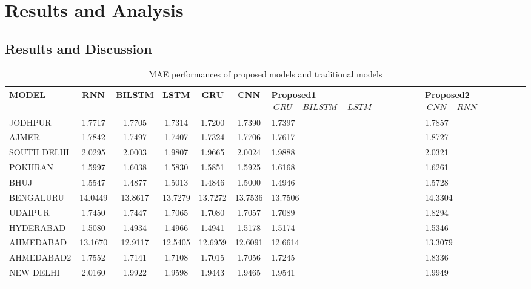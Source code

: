 
\chapter{Results and Analysis} %

\label{c5} %

\section{Results and Discussion}


\begin{table*}[!ht]
  \centering
  \setlength{\tabcolsep}{3pt}
  {\renewcommand{\arraystretch}{1}%
  \caption{MAE performances of proposed models  and traditional models}
  \begin{tabular}{|l|c|c|c|c|c|p{}|p{}|}
  \hline
  \textbf{MODEL} & \textbf{RNN} & \textbf{BILSTM} & \textbf{LSTM} & \textbf{GRU} & \textbf{CNN} &\textbf{Proposed1 \(\ GRU-BILSTM-LSTM \)\ } & \textbf{Proposed2 \(\ CNN-RNN\)\ } \\ \hline
  JODHPUR & 1.7717 & 1.7705 & 1.7314 & 1.7200 & 1.7390 & 1.7397 & 1.7857 \\ \hline
  AJMER & 1.7842 & 1.7497 & 1.7407 & 1.7324 & 1.7706 & 1.7617 & 1.8727 \\ \hline
  SOUTH DELHI & 2.0295 & 2.0003 & 1.9807 & 1.9665 & 2.0024 & 1.9888 & 2.0321 \\ \hline
  POKHRAN & 1.5997 & 1.6038 & 1.5830 & 1.5851 & 1.5925 & 1.6168 & 1.6261 \\ \hline
  BHUJ & 1.5547 & 1.4877 & 1.5013 & 1.4846 & 1.5000 & 1.4946 & 1.5728 \\ \hline
  BENGALURU & 14.0449 & 13.8617 & 13.7279 & 13.7272 & 13.7536 & 13.7506 & 14.3304 \\ \hline
  UDAIPUR & 1.7450 & 1.7447 & 1.7065 & 1.7080 & 1.7057 & 1.7089 & 1.8294 \\ \hline
  HYDERABAD & 1.5080 & 1.4934 & 1.4966 & 1.4941 & 1.5178 & 1.5174 & 1.5346 \\ \hline
  AHMEDABAD & 13.1670 & 12.9117 & 12.5405 & 12.6959 & 12.6091 & 12.6614 & 13.3079 \\ \hline
  AHMEDABAD2 & 1.7552 & 1.7141 & 1.7108 & 1.7015 & 1.7056 & 1.7245 & 1.8336 \\ \hline
  NEW DELHI & 2.0160 & 1.9922 & 1.9598 & 1.9443 & 1.9465 & 1.9541 & 1.9949 \\ \hline
  \label{mae}
  \end{tabular}%
  }
  \end{table*}
